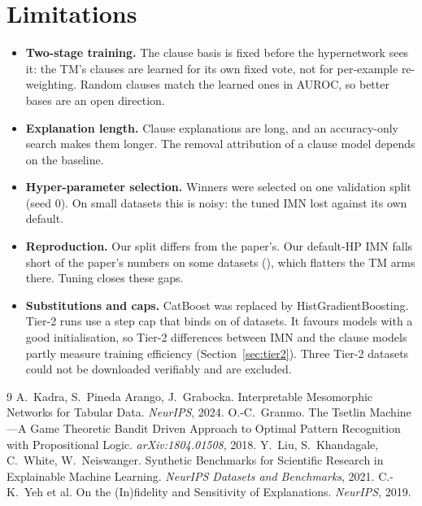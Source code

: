 \documentclass[10pt,a4paper]{article}
\newcommand{\imn}{\textsc{IMN}}
\begin{document}


\FloatBarrier
\section{Limitations}
\begin{itemize}
  \item \textbf{Two-stage training.} The clause basis is fixed before the hypernetwork sees it:
        the TM's clauses are learned for its own fixed vote, not for per-example re-weighting.
        Random clauses match the learned ones in AUROC, so better bases are an open direction.
  \item \textbf{Explanation length.} Clause explanations are long, and an accuracy-only search
        makes them longer. The removal attribution of a clause model depends on the baseline.
  \item \textbf{Hyper-parameter selection.} Winners were selected on one validation split
        (seed 0). On small datasets this is noisy: the tuned \imn{} lost
        \TuneimnWorst{} against its own default.
  \item \textbf{Reproduction.} Our split differs from the paper's. Our default-HP \imn{} falls
        short of the paper's numbers on some datasets (\MainWorstPaperGap), which flatters the
        TM arms there. Tuning closes these gaps.
  \item \textbf{Substitutions and caps.} CatBoost was replaced by HistGradientBoosting. Tier-2
        runs use a step cap that binds on \TiertwoCappedN{} of \TiertwoDatasets{} datasets.
        It favours models with a good initialisation, so Tier-2 differences between \imn{}
        and the clause models partly measure training efficiency
        (Section~\ref{sec:tier2}). Three Tier-2 datasets could not be downloaded verifiably
        and are excluded.
\end{itemize}

\begin{thebibliography}{9}\small
{} A.~Kadra, S.~Pineda Arango, J.~Grabocka. Interpretable Mesomorphic Networks for Tabular
  Data. \emph{NeurIPS}, 2024.
 O.-C.~Granmo. The Tsetlin Machine---A Game Theoretic Bandit Driven Approach to Optimal
  Pattern Recognition with Propositional Logic. \emph{arXiv:1804.01508}, 2018.
 Y.~Liu, S.~Khandagale, C.~White, W.~Neiswanger. Synthetic Benchmarks for Scientific
  Research in Explainable Machine Learning. \emph{NeurIPS Datasets and Benchmarks}, 2021.
 C.-K.~Yeh et al. On the (In)fidelity and Sensitivity of Explanations. \emph{NeurIPS}, 2019.
\end{thebibliography}
\end{document}

